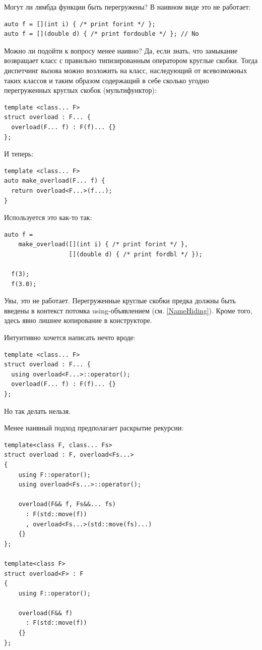 \documentclass[a4paper,12pt,oneside]{article}
\begin{document}
Могут ли лямбда функции быть перегружены? В наивном виде это не работает:

\begin{lstlisting}
auto f = [](int i) { /* print forint */ };
auto f = [](double d) { /* print fordouble */ }; // No
\end{lstlisting}

Можно ли подойти к вопросу менее наивно? Да, если знать, что замыкание возвращает класс с правильно типизированным оператором круглые скобки. Тогда диспетчинг вызова можно возложить на класс, наследующий от всевозможных таких классов и таким образом содержащий в себе сколько угодно перегруженных круглых скобок (мультифунктор):

\begin{lstlisting}
template <class... F>
struct overload : F... {
  overload(F... f) : F(f)... {} 
};
\end{lstlisting}

И теперь:
 
\begin{lstlisting}
template <class... F>
auto make_overload(F... f) {
  return overload<F...>(f...);  
}
\end{lstlisting}

Используется это как-то так:

\begin{lstlisting}
auto f =
    make_overload([](int i) { /* print forint */ },
                  [](double d) { /* print fordbl */ });

  f(3);
  f(3.0);
\end{lstlisting}

Увы, это не работает. Перегруженные круглые скобки предка должны быть введены в контекст потомка using-объявлением (см. \ref{NameHiding}). Кроме того, здесь явно лишнее копирование в конструкторе.

Интуитивно хочется написать нечто вроде:

\begin{lstlisting}
template <class... F>
struct overload : F... {
  using overload<F...>::operator();
  overload(F... f) : F(f)... {} 
};
\end{lstlisting}

Но так делать нельзя.

Менее наивный подход предполагает раскрытие рекурсии:

\begin{lstlisting}
template<class F, class... Fs>
struct overload : F, overload<Fs...>
{
    using F::operator();
    using overload<Fs...>::operator();

    overload(F&& f, Fs&&... fs)
      : F(std::move(f))
      , overload<Fs...>(std::move(fs)...)
    {}
};

template<class F>
struct overload<F> : F
{
    using F::operator();

    overload(F&& f)
      : F(std::move(f))
    {}
};
\end{lstlisting}
\end{document}
